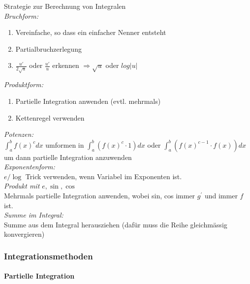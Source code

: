 \begin{KR}{Strategie zur Berechnung von Integralen}
    \\\emph{Bruchform:}
    \begin{enumerate}
        \item Vereinfache, so dass ein einfacher Nenner entsteht
        \item Partialbruchzerlegung
        \item $\frac{u'}{2\sqrt{u}}$ oder $\frac{u'}{u}$ erkennen $\Rightarrow \sqrt{u}$ oder $log|u|$
    \end{enumerate}
    \emph{Produktform:}
    \begin{enumerate}
        \item Partielle Integration anwenden (evtl. mehrmals)
        \item Kettenregel verwenden
    \end{enumerate}
    \emph{Potenzen:}\\
        $\int_{a}^{b} f(x)^{c} d x$ umformen in $\int_{a}^{b}\left(f(x)^{c} \cdot 1\right) d x$ oder $\int_{a}^{b}\left(f(x)^{c-1} \cdot f(x)\right) d x$ um dann partielle Integration anzuwenden\\
    \emph{Exponentenform:}\\
        $e / \log$ Trick verwenden, wenn Variabel im Exponenten ist.\\
    \emph{Produkt mit $e, \sin , \cos$}\\
        Mehrmals partielle Integration anwenden, wobei sin, cos immer $g^{\prime}$ und immer $f$ ist.\\
    \emph{Summe im Integral:}\\
        Summe aus dem Integral herausziehen (dafür muss die Reihe gleichmässig konvergieren)
\end{KR}

\subsubsection{Integrationsmethoden}
\paragraph{Partielle Integration}

